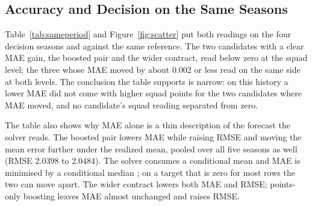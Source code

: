 \documentclass[11pt,a4paper]{article}
\begin{document}
\subsection{Accuracy and Decision on the Same Seasons}
\label{sec:sameperiodresults}

Table~\ref{tab:sameperiod} and Figure~\ref{fig:scatter} put both readings on the four decision seasons and against the same reference. The two candidates with a clear MAE gain, the boosted pair and the wider contract, read below zero at the squad level; the three whose MAE moved by about 0.002 or less read on the same side at both levels. The conclusion the table supports is narrow: on this history a lower MAE did not come with higher squad points for the two candidates where MAE moved, and no candidate's squad reading separated from zero.

The table also shows why MAE alone is a thin description of the forecast the solver reads. The boosted pair lowers MAE while raising RMSE and moving the mean error further under the realized mean, pooled over all five seasons as well (RMSE 2.0398 to 2.0484). The solver consumes a conditional mean and MAE is minimised by a conditional median \cite{gneiting2011}; on a target that is zero for most rows the two can move apart. The wider contract lowers both MAE and RMSE; points-only boosting leaves MAE almost unchanged and raises RMSE.
\end{document}
